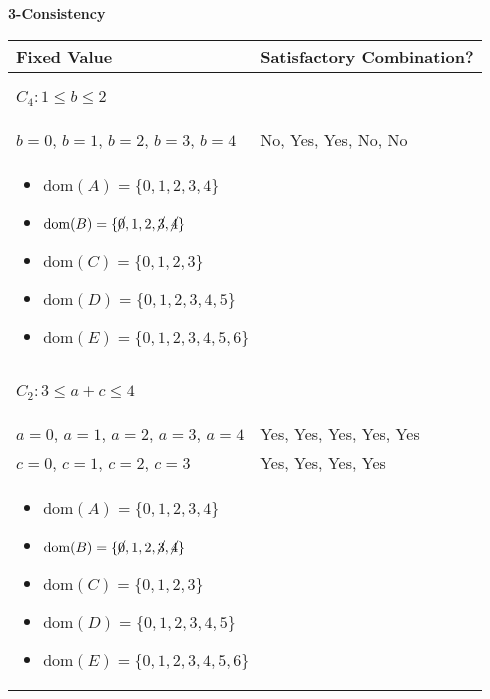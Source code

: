\begin{example} \textbf{3-Consistency}
    \begin{center}
        \begin{tabular}{ll}
            \textbf{Fixed Value} & \textbf{Satisfactory Combination?} \\
            \toprule
            \multicolumn{2}{p{\linewidth}}{
            \begin{center}
                $C_4: 1 \leq b \leq 2$
            \end{center}} \\
            \midrule
                $b = 0$, $b=1$, $b=2$, $b=3$, $b=4$ & No, Yes, Yes, No, No \\
            \multicolumn{2}{p{\linewidth}}{
            \begin{itemize}
                \item $\text{dom}(A) = \{0, 1, 2, 3, 4\}$
                \item $\text{dom}(B) = \{\cancel{0}, 1, 2, \cancel{3}, \cancel{4}\} $
                \item $\text{dom}(C) = \{0, 1, 2, 3\} $
                \item $\text{dom}(D) = \{0, 1, 2, 3, 4, 5\} $
                \item $\text{dom}(E) = \{0, 1, 2, 3, 4, 5, 6\} $
            \end{itemize}} \\
            \midrule
            \multicolumn{2}{p{\linewidth}}{
            \begin{center}
                $C_2: 3 \leq a + c \leq 4$
            \end{center}} \\
            \midrule
                $a=0$, $a=1$, $a=2$, $a=3$, $a=4$ & Yes, Yes, Yes, Yes, Yes \\
                $c=0$, $c=1$, $c=2$, $c=3$ & Yes, Yes, Yes, Yes \\
            \multicolumn{2}{p{\linewidth}}{
            \begin{itemize}
                \item $\text{dom}(A) = \{0, 1, 2, 3, 4\}$
                \item $\text{dom}(B) = \{\cancel{0}, 1, 2, \cancel{3}, \cancel{4}\} $
                \item $\text{dom}(C) = \{0, 1, 2, 3\} $
                \item $\text{dom}(D) = \{0, 1, 2, 3, 4, 5\} $
                \item $\text{dom}(E) = \{0, 1, 2, 3, 4, 5, 6\} $

\end{itemize}}
\end{tabular}
\end{center}
\end{example}
